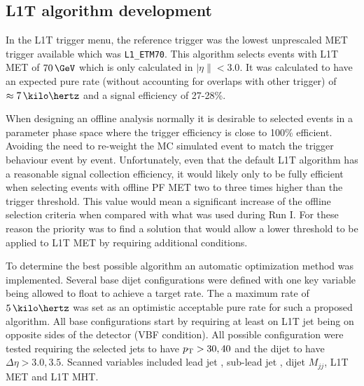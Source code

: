 \subsection{L1T algorithm development}
\label{SECTION:RunIITriggerStudies_L1TAlgorithmDevelopment}


In the \gls{L1T} trigger menu, the reference trigger was the lowest unprescaled \gls{MET} trigger available which was \verb|L1_ETM70|. This algorithm selects events with \gls{L1T} \gls{MET} of $70\,\GeV$ which is only calculated in $|\eta\|<3.0$. It was calculated to have an expected pure rate (without accounting for overlaps with other trigger) of $\approx 7\,\kilo\hertz$ and a signal efficiency of 27-28\%. 

When designing an offline analysis normally it is desirable to selected events in a parameter phase space where the trigger efficiency is close to 100\% efficient. Avoiding the need to re-weight the \gls{MC} simulated event to match the trigger behaviour event by event. Unfortunately, even that the default \gls{L1T} algorithm has a reasonable signal collection efficiency, it would likely only to be fully efficient when selecting events with offline \gls{PF} \gls{MET} two to three times higher than the trigger threshold. This value would mean a significant increase of the offline selection criteria when compared with what was used during Run I. For these reason the priority was to find a solution that would allow a lower threshold to be applied to \gls{L1T} \gls{MET} by requiring additional conditions.

To determine the best possible algorithm an automatic optimization method was implemented. Several base dijet configurations were defined with one key variable being allowed to float to achieve a target rate. The a maximum rate of $5\,\kilo\hertz$ was set as an optimistic acceptable pure rate for such a proposed algorithm. All base configurations start by requiring at least on \gls{L1T} jet being on opposite sides of the detector (\gls{VBF} condition). All possible configuration were tested requiring the selected jets to have $p_{\mathrm{T}}>{30,40}$ and the dijet to have $\Delta\eta>{3.0,3.5}$. Scanned variables included lead jet \pt, sub-lead jet \pt, dijet $M_{jj}$, \gls{L1T} \gls{MET} and \gls{L1T} \gls{MHT}. 

